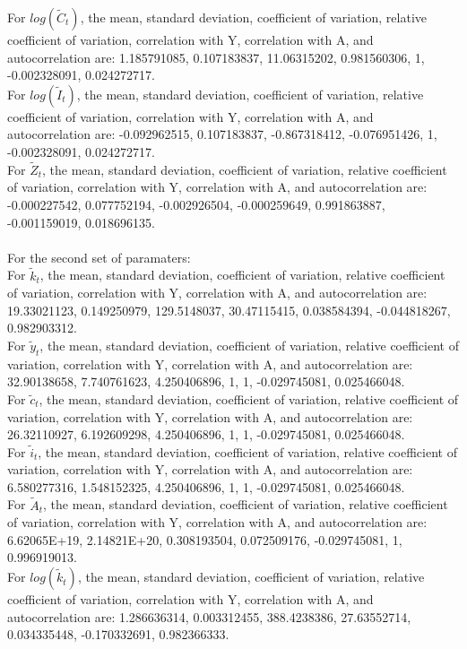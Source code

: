 \documentclass{amsart}
\theoremstyle{plain}
\begin{document}
For $log(\tilde{C}_t)$, the mean, standard deviation, coefficient of variation, relative coefficient of variation, correlation with Y, correlation with A, and autocorrelation are: 1.185791085,	0.107183837,	11.06315202,	0.981560306,	1,	-0.002328091,	0.024272717.\\
For $log(\tilde{I}_t)$, the mean, standard deviation, coefficient of variation, relative coefficient of variation, correlation with Y, correlation with A, and autocorrelation are: -0.092962515,	0.107183837,	-0.867318412,	-0.076951426,	1,	-0.002328091,	0.024272717.\\
For $\tilde{Z}_t$, the mean, standard deviation, coefficient of variation, relative coefficient of variation, correlation with Y, correlation with A, and autocorrelation are: -0.000227542,	0.077752194,	-0.002926504,	-0.000259649,	0.991863887,	-0.001159019,	0.018696135.\\ \\
For the second set of paramaters:\\
For $\tilde{k}_t$, the mean, standard deviation, coefficient of variation, relative coefficient of variation, correlation with Y, correlation with A, and autocorrelation are: 19.33021123,	0.149250979,	129.5148037,	30.47115415,	0.038584394,	-0.044818267,	0.982903312.\\
For $\tilde{y}_t$, the mean, standard deviation, coefficient of variation, relative coefficient of variation, correlation with Y, correlation with A, and autocorrelation are: 32.90138658,	7.740761623,	4.250406896,	1,	1,	-0.029745081,	0.025466048.
\\
For $\tilde{c}_t$, the mean, standard deviation, coefficient of variation, relative coefficient of variation, correlation with Y, correlation with A, and autocorrelation are: 26.32110927,	6.192609298,	4.250406896,	1,	1,	-0.029745081,	0.025466048.
\\
For $\tilde{i}_t$, the mean, standard deviation, coefficient of variation, relative coefficient of variation, correlation with Y, correlation with A, and autocorrelation are: 6.580277316,	1.548152325,	4.250406896,	1,	1,	-0.029745081,	0.025466048.\\
For $\tilde{A}_t$, the mean, standard deviation, coefficient of variation, relative coefficient of variation, correlation with Y, correlation with A, and autocorrelation are: 6.62065E+19,	2.14821E+20,	0.308193504,	0.072509176,	-0.029745081,	1,	0.996919013.\\
For $log(\tilde{k}_t)$, the mean, standard deviation, coefficient of variation, relative coefficient of variation, correlation with Y, correlation with A, and autocorrelation are: 1.286636314,	0.003312455,	388.4238386,	27.63552714,	0.034335448,	-0.170332691,	0.982366333.\\
\end{document}
